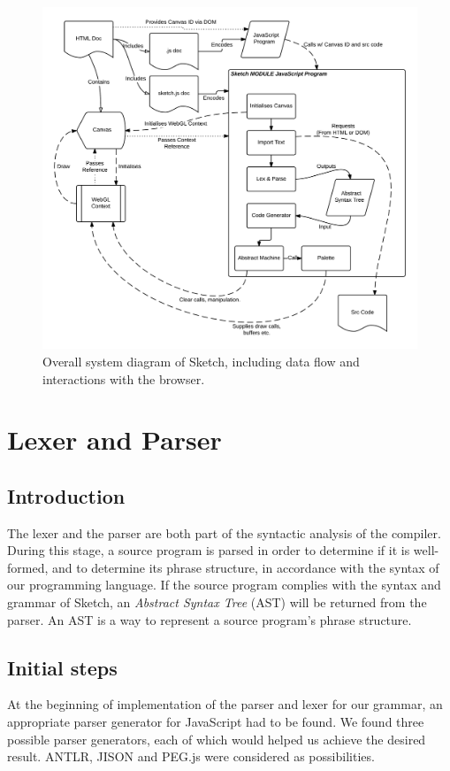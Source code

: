 \documentclass{l3proj}
\begin{document}
\begin{figure}[!h]
\centering
\includegraphics[width=\textwidth]{images/sys-diag}
\caption{Overall system diagram of Sketch, including data flow and interactions with the browser.}
\label{fig:sketch-overall}
\end{figure}

\section{Lexer and Parser}
\label{arch-lex}
\subsection{Introduction}
The lexer and the parser are both part of the syntactic analysis of the compiler. During this stage, a source program is parsed in order to determine if it is well-formed, and to determine its phrase structure, in accordance with the syntax of our programming language. If the source program complies with the syntax and grammar of Sketch, an \textit{Abstract Syntax Tree} (AST) will be returned from the parser. An AST is a way to represent a source program’s phrase structure. 

\subsection{Initial steps}
At the beginning of implementation of the parser and lexer for our grammar, an appropriate parser generator for JavaScript had to be found. We found three possible parser generators, each of which would helped us achieve the desired result. ANTLR, JISON and PEG.js were considered as possibilities.
\end{document}
